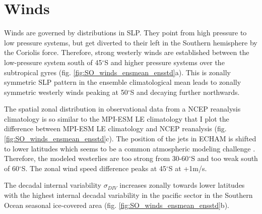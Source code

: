 \section{Winds}
\label{sec:winds_model_eval}
Winds are governed by distributions in \ac{SLP}. They point from high pressure to low pressure systems, but get diverted to their left in the Southern hemisphere by the Coriolis force. Therefore, strong westerly winds are established between the low-pressure system south of 45$^\circ$S and higher pressure systems over the subtropical gyres (fig. \ref{fig:SO_winds_ensmean_ensstd}a). This is zonally symmetric \acs{SLP} pattern in the ensemble climatological mean leads to zonally symmetric westerly winds peaking at 50$^\circ$S and decaying further northwards.\newline

The spatial zonal distribution in observational data from a \acs{NCEP} reanalysis climatology is so similar to the \acs{MPI-ESM LE} climatology that I plot the difference between \acs{MPI-ESM LE} climatology and \acs{NCEP} reanalysis \citep{Kalnay1996} (fig. \ref{fig:SO_winds_ensmean_ensstd}c). The position of the jets in \acs{ECHAM} is shifted to lower latitudes \citep{Stevens2013} which seems to be a common atmospheric modeling challenge \citep{Kidston2010}. Therefore, the modeled westerlies are too strong from 30-60$^\circ$S and too weak south of 60$^\circ$S. The zonal wind speed difference peaks at 45$^\circ$S at +1m/s.\newline

The decadal internal variability $\sigma_{DIV}$ increases zonally towards lower latitudes with the highest internal decadal variability in the pacific sector in the Southern Ocean seasonal ice-covered area (fig. \ref{fig:SO_winds_ensmean_ensstd}b).\newline

